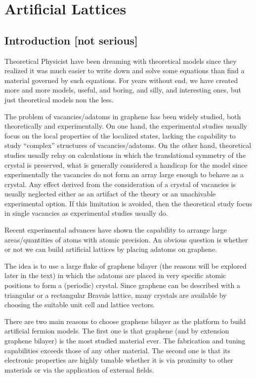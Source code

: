 \chapter{Artificial Lattices}
\section{Introduction [not serious]}
Theoretical Physicist have been dreaming with theoretical models since they realized it was much easier to write down and solve some equations than find a material governed by such equations. For years without end, we have created more and more models, useful, and boring, and silly, and interesting ones, but just theoretical models non the less.

The problem of vacancies/adatoms in graphene has been widely studied, both theoretically and experimentally. On one hand, the experimental studies usually focus on the local properties of the localized states, lacking the capability to study ``complex'' structures of vacancies/adatoms. On the other hand, theoretical studies usually relay on calculations in which the translational symmetry of the crystal is preserved, what is generally considered a handicap for the model since experimentally the vacancies do not form an array large enough to behave as a crystal. Any effect derived from the consideration of a crystal of vacancies is usually neglected either as an artifact of the theory or an unachivable experimental option. If this limitation is avoided, then the theoretical study focus in single vacancies as experimental studies usually do.

Recent experimental advances have shown the capability to arrange large areas/quantities of atoms with atomic precision\cite{Brihuega2016,Kalff2016}.
An obvious question is whether or not we can build artificial lattices by placing adatoms on graphene.

The idea is to use a large flake of graphene bilayer (the reasons will be explored later in the text) in which the adatoms are placed in very specific atomic positions to form a (periodic) crystal. Since graphene can be described with a triangular or a rectangular Bravais lattice, many crystals are available by choosing the suitable unit cell and lattice vectors.


There are two main reasons to choose graphene bilayer as the platform to build artificial fermion models. The first one is that graphene (and by extension graphene bilayer) is the most studied material ever. The fabrication and tuning capabilities exceeds those of any other material. The second one is that its electronic properties are highly tunable whether it is via proximity to other materials or via the application of external fields.

